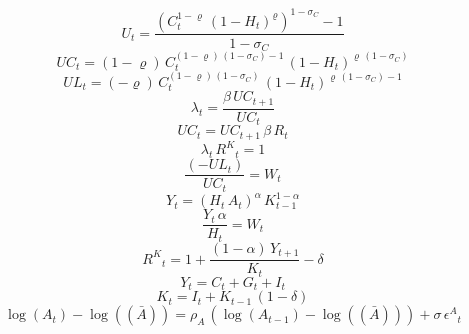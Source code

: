 \begin{dmath}
{U}_{t}=\frac{\left({C}_{t}^{1-{{\varrho}}}\, \left(1-{H}_{t}\right)^{{{\varrho}}}\right)^{1-{{\sigma_{C}}}}-1}{1-{{\sigma_{C}}}}
\end{dmath}
\begin{dmath}
{UC}_{t}=\left(1-{{\varrho}}\right)\, {C}_{t}^{\left(1-{{\varrho}}\right)\, \left(1-{{\sigma_{C}}}\right)-1}\, \left(1-{H}_{t}\right)^{{{\varrho}}\, \left(1-{{\sigma_{C}}}\right)}
\end{dmath}
\begin{dmath}
{UL}_{t}=\left(-{{\varrho}}\right)\, {C}_{t}^{\left(1-{{\varrho}}\right)\, \left(1-{{\sigma_{C}}}\right)}\, \left(1-{H}_{t}\right)^{{{\varrho}}\, \left(1-{{\sigma_{C}}}\right)-1}
\end{dmath}
\begin{dmath}
{\lambda}_{t}=\frac{{{\beta}}\, {UC}_{t+1}}{{UC}_{t}}
\end{dmath}
\begin{dmath}
{UC}_{t}={UC}_{t+1}\, {{\beta}}\, {R}_{t}
\end{dmath}
\begin{dmath}
{\lambda}_{t}\, {R^{K}}_{t}=1
\end{dmath}
\begin{dmath}
\frac{\left(-{UL}_{t}\right)}{{UC}_{t}}={W}_{t}
\end{dmath}
\begin{dmath}
{Y}_{t}=\left({H}_{t}\, {A}_{t}\right)^{{{\alpha}}}\, {K}_{t-1}^{1-{{\alpha}}}
\end{dmath}
\begin{dmath}
\frac{{Y}_{t}\, {{\alpha}}}{{H}_{t}}={W}_{t}
\end{dmath}
\begin{dmath}
{R^{K}}_{t}=1+\frac{\left(1-{{\alpha}}\right)\, {Y}_{t+1}}{{K}_{t}}-{{\delta}}
\end{dmath}
\begin{dmath}
{Y}_{t}={C}_{t}+{G}_{t}+{I}_{t}
\end{dmath}
\begin{dmath}
{K}_{t}={I}_{t}+{K}_{t-1}\, \left(1-{{\delta}}\right)
\end{dmath}
\begin{dmath}
\log\left({A}_{t}\right)-\log\left((\bar{A})\right)={{\rho_{A}}}\, \left(\log\left({A}_{t-1}\right)-\log\left((\bar{A})\right)\right)+{{\sigma}}\, {{\epsilon^{A}}}_{t}
\end{dmath}

